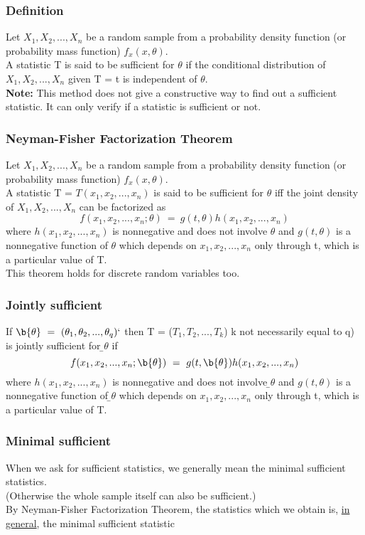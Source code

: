 \subsubsection*{Definition}
Let $X_1,X_2,...,X_n$ be a random sample from a
probability density function (or probability mass function) $f_x(x,\theta)$.\\
A statistic T is said to be sufficient for $\theta$ if the conditional
distribution of $X_1,X_2,...,X_n$ given T = t is independent of $\theta$.\\
\textbf{Note:} This method does not give a constructive way to find out a sufficient statistic. It can only verify if a statistic is sufficient or not.
\subsubsection*{Neyman{-}Fisher Factorization Theorem}
Let $X_1,X_2,...,X_n$ be a random sample from a
probability density function (or probability mass function) $f_x(x,\theta)$.\\
A statistic T = $T(x_1,x_2,...,x_n)$ is said to be sufficient for $\theta$ iff the joint density of $X_1,X_2,...,X_n$ can be factorized as 
\[ f(x_1,x_2,...,x_n;\theta)\ =\ g(t,\theta)h(x_1,x_2,...,x_n)\]
where $h(x_1,x_2,...,x_n)$ is nonnegative and does not involve $\theta$ and $g(t,\theta)$ is a nonnegative function of $\theta$ which depends on $x_1,x_2,...,x_n$ only through t, which is a particular value of T.\\
This theorem holds for discrete random variables too.
\subsubsection*{Jointly sufficient}
If $\b{\theta}\ =\ (\theta_1,\theta_2,...,\theta_q)`$ then T = ($T_1,T_2,...,T_k$) k not necessarily equal to q) is jointly sufficient for \b${\theta}$ if
\[ f(x_1,x_2,...,x_n;\b{\theta})\ =\ g(t,\b{\theta})h(x_1,x_2,...,x_n)\]
where $h(x_1,x_2,...,x_n)$ is nonnegative and does not involve \b${\theta}$ and $g(t,\theta)$ is a nonnegative function of \b${\theta}$ which depends on $x_1,x_2,...,x_n$ only through t, which is a particular value of T.
\subsubsection*{Minimal sufficient}
When we ask for sufficient statistics, we generally mean the minimal
sufficient statistics.\\
(Otherwise the whole sample itself can also be sufficient.)\\
By Neyman{-}Fisher Factorization Theorem, the statistics which we
obtain is, \underline{in general}, the minimal sufficient statistic

